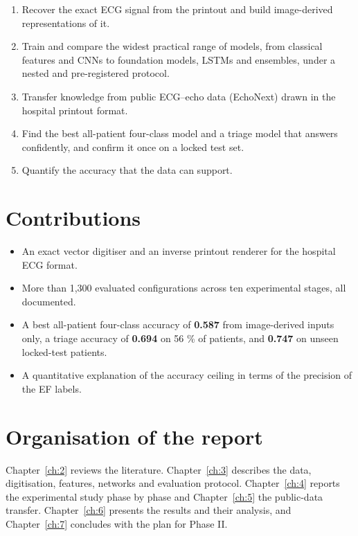 \begin{enumerate}
  \item Recover the exact ECG signal from the printout and build image-derived representations of it.
  \item Train and compare the widest practical range of models, from classical features and CNNs to foundation models, LSTMs and ensembles, under a nested and pre-registered protocol.
  \item Transfer knowledge from public ECG--echo data (EchoNext) drawn in the hospital printout format.
  \item Find the best all-patient four-class model and a triage model that answers confidently, and confirm it once on a locked test set.
  \item Quantify the accuracy that the data can support.
\end{enumerate}
\section{Contributions}\label{sec:1.4}

\begin{itemize}
  \item An exact vector digitiser and an inverse printout renderer for the hospital ECG format.
  \item More than 1,300 evaluated configurations across ten experimental stages, all documented.
  \item A best all-patient four-class accuracy of \textbf{0.587} from image-derived inputs only, a triage accuracy of \textbf{0.694} on 56 \% of patients, and \textbf{0.747} on unseen locked-test patients.
  \item A quantitative explanation of the accuracy ceiling in terms of the precision of the EF labels.
\end{itemize}
\section{Organisation of the report}\label{sec:1.5}

Chapter~\ref{ch:2} reviews the literature. Chapter~\ref{ch:3} describes the data, digitisation, features, networks and evaluation protocol. Chapter~\ref{ch:4} reports the experimental study phase by phase and Chapter~\ref{ch:5} the public-data transfer. Chapter~\ref{ch:6} presents the results and their analysis, and Chapter~\ref{ch:7} concludes with the plan for Phase II.

